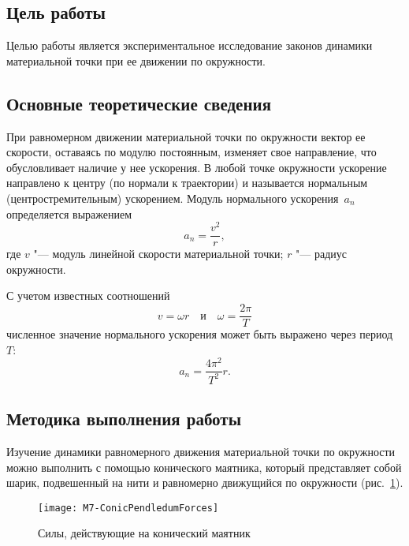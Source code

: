 \documentclass[a4paper, 12pt]{extarticle}
\begin{document}
\MTDTitlePage
\MTDInfoPage

\setcounter{section}{7}

\subsection{Цель работы}
Целью работы является экспериментальное исследование законов динамики  материальной точки при ее движении по окружности.

\subsection{Основные теоретические сведения}
При равномерном движении материальной точки по окружности вектор ее скорости, оставаясь по модулю постоянным, изменяет свое направление,  что обусловливает наличие у нее ускорения. В любой точке окружности ускорение направлено к центру (по нормали к траектории) и называется нормальным (центростремительным) ускорением. Модуль нормального ускорения~$a_n$ определяется выражением
\begin{equation}
\label{eq:m7-radial-acc-1}
a_n = \frac{v^2}{r},
\end{equation}
где $v$ "--- модуль линейной скорости материальной точки; $r$ "--- радиус окружности.

С учетом известных соотношений
\begin{equation}
\label{eq:m7-angular-velocity}
v = \omega r \quad \text{и} \quad \omega = \frac{2\pi}{T} %
\end{equation}
численное значение нормального ускорения может быть выражено через период~$T$: %
\begin{equation}
\label{eq:m7-radial-acc-2}
a_n = \frac{4\pi^2}{T^2}r.
\end{equation}

\subsection{Методика выполнения работы}
Изучение динамики равномерного движения материальной точки по окружности можно выполнить с помощью конического маятника, который представляет собой шарик, подвешенный на нити и равномерно движущийся по окружности (рис.~\ref{fig:m7-conical-pendulum}).

\begin{figure}[h] %
\begin{center}
\texttt{[image: M7-ConicPendledumForces]}
\end{center}
\caption{Силы, действующие на конический маятник \label{fig:m7-conical-pendulum}}
\end{figure}
\end{document}
